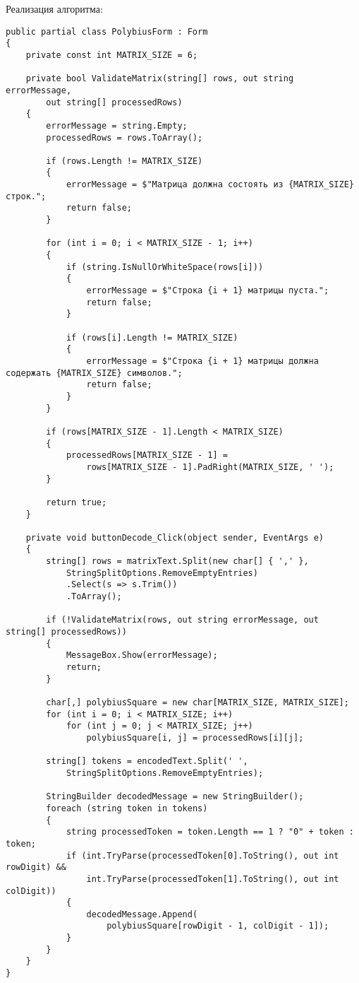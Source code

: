 \documentclass[a4paper, 14pt]{extarticle}
\begin{document}
Реализация алгоритма:
\begin{lstlisting}[caption=Реализация шифра Полибия]
public partial class PolybiusForm : Form
{
    private const int MATRIX_SIZE = 6;

    private bool ValidateMatrix(string[] rows, out string errorMessage, 
        out string[] processedRows)
    {
        errorMessage = string.Empty;
        processedRows = rows.ToArray();

        if (rows.Length != MATRIX_SIZE)
        {
            errorMessage = $"Матрица должна состоять из {MATRIX_SIZE} строк.";
            return false;
        }

        for (int i = 0; i < MATRIX_SIZE - 1; i++)
        {
            if (string.IsNullOrWhiteSpace(rows[i]))
            {
                errorMessage = $"Строка {i + 1} матрицы пуста.";
                return false;
            }

            if (rows[i].Length != MATRIX_SIZE)
            {
                errorMessage = $"Строка {i + 1} матрицы должна содержать {MATRIX_SIZE} символов.";
                return false;
            }
        }

        if (rows[MATRIX_SIZE - 1].Length < MATRIX_SIZE)
        {
            processedRows[MATRIX_SIZE - 1] = 
                rows[MATRIX_SIZE - 1].PadRight(MATRIX_SIZE, ' ');
        }

        return true;
    }

    private void buttonDecode_Click(object sender, EventArgs e)
    {
        string[] rows = matrixText.Split(new char[] { ',' }, 
            StringSplitOptions.RemoveEmptyEntries)
            .Select(s => s.Trim())
            .ToArray();

        if (!ValidateMatrix(rows, out string errorMessage, out string[] processedRows))
        {
            MessageBox.Show(errorMessage);
            return;
        }

        char[,] polybiusSquare = new char[MATRIX_SIZE, MATRIX_SIZE];
        for (int i = 0; i < MATRIX_SIZE; i++)
            for (int j = 0; j < MATRIX_SIZE; j++)
                polybiusSquare[i, j] = processedRows[i][j];

        string[] tokens = encodedText.Split(' ', 
            StringSplitOptions.RemoveEmptyEntries);

        StringBuilder decodedMessage = new StringBuilder();
        foreach (string token in tokens)
        {
            string processedToken = token.Length == 1 ? "0" + token : token;
            if (int.TryParse(processedToken[0].ToString(), out int rowDigit) &&
                int.TryParse(processedToken[1].ToString(), out int colDigit))
            {
                decodedMessage.Append(
                    polybiusSquare[rowDigit - 1, colDigit - 1]);
            }
        }
    }
}
\end{lstlisting}
\end{document}

